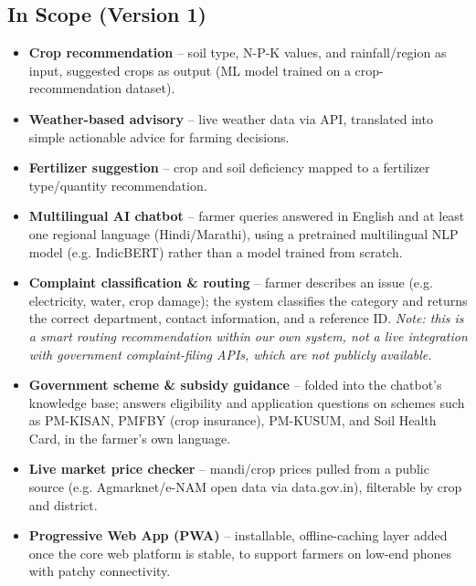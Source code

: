\documentclass[11pt,a4paper]{article}
\begin{document}
\subsection{In Scope (Version 1)}
\begin{itemize}[leftmargin=*]
  \item \textbf{Crop recommendation} -- soil type, N-P-K values, and
    rainfall/region as input, suggested crops as output (ML model trained
    on a crop-recommendation dataset).
  \item \textbf{Weather-based advisory} -- live weather data via API,
    translated into simple actionable advice for farming decisions.
  \item \textbf{Fertilizer suggestion} -- crop and soil deficiency mapped
    to a fertilizer type/quantity recommendation.
  \item \textbf{Multilingual AI chatbot} -- farmer queries answered in
    English and at least one regional language (Hindi/Marathi), using a
    pretrained multilingual NLP model (e.g. IndicBERT) rather than a
    model trained from scratch.
  \item \textbf{Complaint classification \& routing} -- farmer describes
    an issue (e.g. electricity, water, crop damage); the system classifies
    the category and returns the correct department, contact information,
    and a reference ID. \emph{Note: this is a smart routing
    recommendation within our own system, not a live integration with
    government complaint-filing APIs, which are not publicly available.}
  \item \textbf{Government scheme \& subsidy guidance} -- folded into the
    chatbot's knowledge base; answers eligibility and application
    questions on schemes such as PM-KISAN, PMFBY (crop insurance),
    PM-KUSUM, and Soil Health Card, in the farmer's own language.
  \item \textbf{Live market price checker} -- mandi/crop prices pulled
    from a public source (e.g. Agmarknet/e-NAM open data via
    data.gov.in), filterable by crop and district.
  \item \textbf{Progressive Web App (PWA)} -- installable, offline-caching
    layer added once the core web platform is stable, to support farmers
    on low-end phones with patchy connectivity.
\end{itemize}
\end{document}
